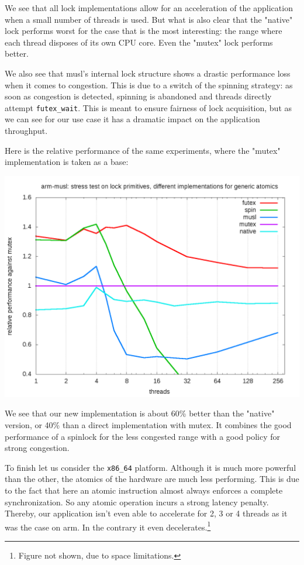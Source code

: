 \itemadjust
We see that all lock implementations allow for an acceleration of
the application when a small number of threads is used. But what is
also clear that the "native" lock performs worst for the case that
is the most interesting: the range where each thread disposes of
its own CPU core. Even the "mutex" lock performs better.

We also see that musl's internal lock structure shows a drastic
performance loss when it comes to congestion. This is due to a
switch of the spinning strategy: as soon as congestion is detected,
spinning is abandoned and threads directly attempt
\texttt{futex\_wait}. This is meant to ensure fairness of lock acquisition,
but as we can see for our use case it has a dramatic impact on the
application throughput.

Here is the relative performance of the same experiments, where the
"mutex" implementation is taken as a base:

\begin{center}
\includegraphics[width=0.95\linewidth]{benchs/arm/test-arm-u64-relative.png}
\end{center}

We see that our new implementation is about 60\% better than
the "native" version, or 40\% than a direct implementation with
mutex. It combines the good performance of a spinlock for the less
congested range with a good policy for strong congestion.

To finish let us consider the \texttt{x86\_64} platform. Although it
is much more powerful than the other, the atomics of the hardware
are much less performing. This is due to the fact that here an
atomic instruction almost always enforces a complete
synchronization. So any atomic operation incurs a strong latency
penalty. Thereby, our application isn't even able to accelerate for
2, 3 or 4 threads as it was the case on arm. In the contrary it
even decelerates.\footnote{Figure not shown, due to space limitations.}

